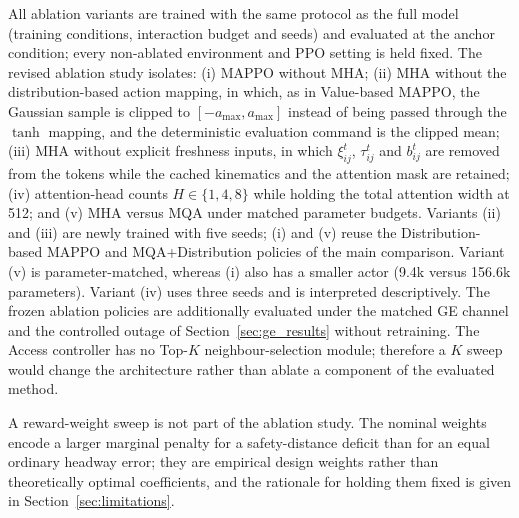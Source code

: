 \documentclass{ieeeaccess}
\begin{document}
All ablation variants are trained with the same protocol as the full model (training conditions, interaction budget and seeds) and evaluated at the anchor condition; every non-ablated environment and PPO setting is held fixed. The revised ablation study isolates: (i) MAPPO without MHA; (ii) MHA without the distribution-based action mapping, in which, as in Value-based MAPPO, the Gaussian sample is clipped to $[-a_{\max},a_{\max}]$ instead of being passed through the $\tanh$ mapping, and the deterministic evaluation command is the clipped mean; (iii) MHA without explicit freshness inputs, in which $\xi_{ij}^t$, $\tau_{ij}^t$ and $b_{ij}^t$ are removed from the tokens while the cached kinematics and the attention mask are retained; (iv) attention-head counts $H\in\{1,4,8\}$ while holding the total attention width at 512; and (v) MHA versus MQA under matched parameter budgets. Variants (ii) and (iii) are newly trained with five seeds; (i) and (v) reuse the Distribution-based MAPPO and MQA+Distribution policies of the main comparison. Variant (v) is parameter-matched, whereas (i) also has a smaller actor (9.4k versus 156.6k parameters). Variant (iv) uses three seeds and is interpreted descriptively. The frozen ablation policies are additionally evaluated under the matched GE channel and the controlled outage of Section~\ref{sec:ge_results} without retraining. The Access controller has no Top-$K$ neighbour-selection module; therefore a $K$ sweep would change the architecture rather than ablate a component of the evaluated method. %

A reward-weight sweep is not part of the ablation study. The nominal weights encode a larger marginal penalty for a safety-distance deficit than for an equal ordinary headway error; they are empirical design weights rather than theoretically optimal coefficients, and the rationale for holding them fixed is given in Section~\ref{sec:limitations}.
\end{document}
